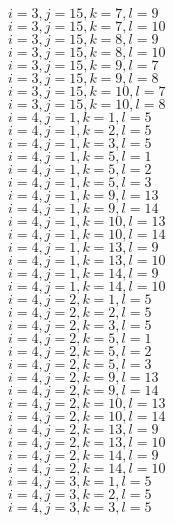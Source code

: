 \documentclass[14pt]{article}
\begin{document}
    $i=3,j=15,k=7,l=9 $ \\ 
    $i=3,j=15,k=7,l=10 $ \\ 
    $i=3,j=15,k=8,l=9 $ \\ 
    $i=3,j=15,k=8,l=10 $ \\ 
    $i=3,j=15,k=9,l=7 $ \\ 
    $i=3,j=15,k=9,l=8 $ \\ 
    $i=3,j=15,k=10,l=7 $ \\ 
    $i=3,j=15,k=10,l=8 $ \\ 
    $i=4,j=1,k=1,l=5 $ \\ 
    $i=4,j=1,k=2,l=5 $ \\ 
    $i=4,j=1,k=3,l=5 $ \\ 
    $i=4,j=1,k=5,l=1 $ \\ 
    $i=4,j=1,k=5,l=2 $ \\ 
    $i=4,j=1,k=5,l=3 $ \\ 
    $i=4,j=1,k=9,l=13 $ \\ 
    $i=4,j=1,k=9,l=14 $ \\ 
    $i=4,j=1,k=10,l=13 $ \\ 
    $i=4,j=1,k=10,l=14 $ \\ 
    $i=4,j=1,k=13,l=9 $ \\ 
    $i=4,j=1,k=13,l=10 $ \\ 
    $i=4,j=1,k=14,l=9 $ \\ 
    $i=4,j=1,k=14,l=10 $ \\ 
    $i=4,j=2,k=1,l=5 $ \\ 
    $i=4,j=2,k=2,l=5 $ \\ 
    $i=4,j=2,k=3,l=5 $ \\ 
    $i=4,j=2,k=5,l=1 $ \\ 
    $i=4,j=2,k=5,l=2 $ \\ 
    $i=4,j=2,k=5,l=3 $ \\ 
    $i=4,j=2,k=9,l=13 $ \\ 
    $i=4,j=2,k=9,l=14 $ \\ 
    $i=4,j=2,k=10,l=13 $ \\ 
    $i=4,j=2,k=10,l=14 $ \\ 
    $i=4,j=2,k=13,l=9 $ \\ 
    $i=4,j=2,k=13,l=10 $ \\ 
    $i=4,j=2,k=14,l=9 $ \\ 
    $i=4,j=2,k=14,l=10 $ \\ 
    $i=4,j=3,k=1,l=5 $ \\ 
    $i=4,j=3,k=2,l=5 $ \\ 
    $i=4,j=3,k=3,l=5 $ \\ 
\end{document}
